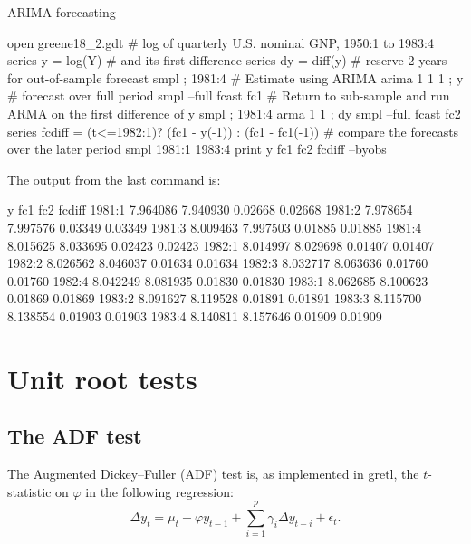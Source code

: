 \begin{script}[htbp]
  \caption{ARIMA forecasting}
  \label{arima-fcast-script}
\begin{scode}
open greene18_2.gdt
# log of quarterly U.S. nominal GNP, 1950:1 to 1983:4
series y = log(Y)
# and its first difference
series dy = diff(y)
# reserve 2 years for out-of-sample forecast
smpl ; 1981:4
# Estimate using ARIMA
arima 1 1 1 ; y 
# forecast over full period
smpl --full
fcast fc1
# Return to sub-sample and run ARMA on the first difference of y
smpl ; 1981:4
arma 1 1 ; dy
smpl --full
fcast fc2
series fcdiff = (t<=1982:1)? (fc1 - y(-1)) : (fc1 - fc1(-1))
# compare the forecasts over the later period
smpl 1981:1 1983:4
print y fc1 fc2 fcdiff --byobs
\end{scode}
\scriptURL
The output from the last command is:
%
\begin{code}
                  y          fc1          fc2       fcdiff
1981:1      7.964086     7.940930      0.02668      0.02668
1981:2      7.978654     7.997576      0.03349      0.03349
1981:3      8.009463     7.997503      0.01885      0.01885
1981:4      8.015625     8.033695      0.02423      0.02423
1982:1      8.014997     8.029698      0.01407      0.01407
1982:2      8.026562     8.046037      0.01634      0.01634
1982:3      8.032717     8.063636      0.01760      0.01760
1982:4      8.042249     8.081935      0.01830      0.01830
1983:1      8.062685     8.100623      0.01869      0.01869
1983:2      8.091627     8.119528      0.01891      0.01891
1983:3      8.115700     8.138554      0.01903      0.01903
1983:4      8.140811     8.157646      0.01909      0.01909
\end{code}
\end{script}


\section{Unit root tests}
\label{sec:uroot}

\subsection{The ADF test}
\label{sec:ADFtest}

The Augmented Dickey--Fuller (ADF) test is, as implemented in
gretl, the $t$-statistic on $\varphi$ in the following regression:
\begin{equation}
  \label{eq:ADFtest}
  \Delta y_t = \mu_t + \varphi y_{t-1} + \sum_{i=1}^p \gamma_i \Delta
  y_{t-i} + \epsilon_t .
\end{equation}

